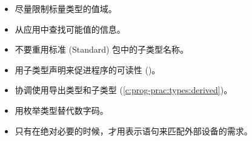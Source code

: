\noindent
\begin{itemize}
    \item 尽量限制标量类型的值域。
    \item 从应用中查找可能值的信息。
    \item 不要重用标准 (Standard) 包中的子类型名称。
    \item 用子类型声明来促进程序的可读性 (\cite{booch87})。
    \item 协调使用导出类型和子类型 (\ref{c:prog-prac:types:derived})。

    \item 用枚举类型替代数字码。
    \item 只有在绝对必要的时候，才用表示语句来匹配外部设备的需求。
\end{itemize}
